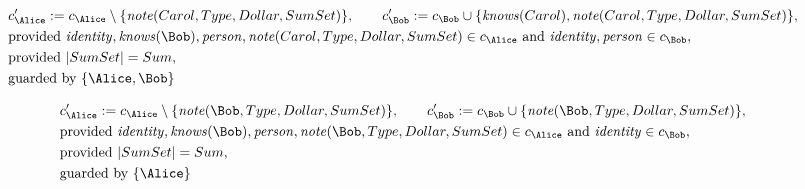 \begin{align*}
&
c'_
{
\Alice
}
 := 
c_
{
\Alice
}
 \setminus 
\{
\mathit{\detokenize{
note
}}
(
Carol
,
Type
,
Dollar
,
SumSet
)
\}
, \qquad 
c'_
{
\Bob
}
 := 
c_
{
\Bob
}
 \cup 
\{
\mathit{\detokenize{
knows
}}
(
Carol
)
,
\mathit{\detokenize{
note
}}
(
Carol
,
Type
,
Dollar
,
SumSet
)
\}
,\\
&
\text{provided } 
\mathit{\detokenize{
identity
}}
,
\mathit{\detokenize{
knows
}}
(
\Bob
)
,
\mathit{\detokenize{
person
}}
,
\mathit{\detokenize{
note
}}
(
Carol
,
Type
,
Dollar
,
SumSet
)
 \in c_
{
\Alice
}
 \text{ and } 
\mathit{\detokenize{
identity
}}
,
\mathit{\detokenize{
person
}}
 \in c_
{
\Bob
}
,\\
&
\text{provided } 
|
SumSet
|
=
Sum
,\\
&
\text{guarded by } \{
\Alice
,
\Bob
\}
\end{align*}

\begin{align*}
&
c'_
{
\Alice
}
 := 
c_
{
\Alice
}
 \setminus 
\{
\mathit{\detokenize{
note
}}
(
\Bob
,
Type
,
Dollar
,
SumSet
)
\}
, \qquad 
c'_
{
\Bob
}
 := 
c_
{
\Bob
}
 \cup 
\{
\mathit{\detokenize{
note
}}
(
\Bob
,
Type
,
Dollar
,
SumSet
)
\}
,\\
&
\text{provided } 
\mathit{\detokenize{
identity
}}
,
\mathit{\detokenize{
knows
}}
(
\Bob
)
,
\mathit{\detokenize{
person
}}
,
\mathit{\detokenize{
note
}}
(
\Bob
,
Type
,
Dollar
,
SumSet
)
 \in c_
{
\Alice
}
 \text{ and } 
\mathit{\detokenize{
identity
}}
 \in c_
{
\Bob
}
,\\
&
\text{provided } 
|
SumSet
|
=
Sum
,\\
&
\text{guarded by } \{
\Alice
\}
\end{align*}

